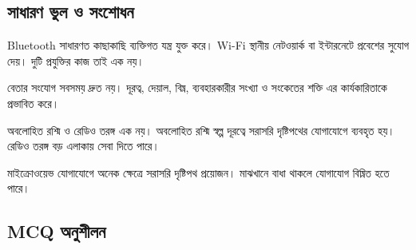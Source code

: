 


\subsection{সাধারণ ভুল ও সংশোধন}

Bluetooth সাধারণত কাছাকাছি ব্যক্তিগত যন্ত্র যুক্ত করে। Wi-Fi স্থানীয় নেটওয়ার্ক বা ইন্টারনেটে প্রবেশের সুযোগ দেয়। দুটি প্রযুক্তির কাজ তাই এক নয়।

বেতার সংযোগ সবসময় দ্রুত নয়। দূরত্ব, দেয়াল, বিঘ্ন, ব্যবহারকারীর সংখ্যা ও সংকেতের শক্তি এর কার্যকারিতাকে প্রভাবিত করে।

অবলোহিত রশ্মি ও রেডিও তরঙ্গ এক নয়। অবলোহিত রশ্মি স্বল্প দূরত্বে সরাসরি দৃষ্টিপথের যোগাযোগে ব্যবহৃত হয়। রেডিও তরঙ্গ বড় এলাকায় সেবা দিতে পারে।

মাইক্রোওয়েভ যোগাযোগে অনেক ক্ষেত্রে সরাসরি দৃষ্টিপথ প্রয়োজন। মাঝখানে বাধা থাকলে যোগাযোগ বিঘ্নিত হতে পারে।

\subsection{MCQ অনুশীলন}

